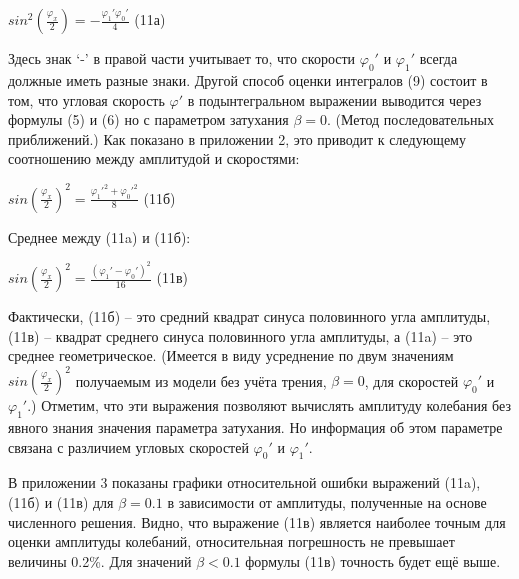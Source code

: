 \documentclass[a4paper]{article}
\begin{document}
\begin{center}$sin^2(\frac{\varphi_x}{2})= -\frac{\varphi_1'\varphi_0'}{4}$ (11а)\end{center}
Здесь знак ‘-’ в правой части учитывает то, что скорости $\varphi_0'$ и $\varphi_1'$ всегда
должные иметь разные знаки.
Другой способ оценки интегралов (9) состоит в том, что угловая скорость $\varphi'$ в подынтегральном выражении выводится через формулы (5)
и (6) но с параметром затухания $\beta=0$. (Метод последовательных приближений.) Как показано в приложении 2, это приводит к следующему
соотношению между амплитудой и скоростями:
\begin{center}$sin(\frac{\varphi_x}{2})^2= \frac{\varphi_1'^2+\varphi_0'^2}{8}$ (11б)\end{center}
Среднее между (11a) и (11б):
\begin{center}$sin(\frac{\varphi_x}{2})^2= \frac{(\varphi_1' - \varphi_0')^2}{16}$ (11в)\end{center}
Фактически, (11б) – это средний квадрат синуса половинного угла 
амплитуды, (11в) – квадрат среднего синуса половинного угла амплитуды, а (11a) – это среднее геометрическое. (Имеется в виду усреднение
по двум значениям $sin(\frac{\varphi_x}{2})^2$ получаемым из модели без учёта трения,
$\beta=0$, для скоростей $\varphi_0'$ и $\varphi_1'$.) Отметим, что эти выражения позволяют
вычислять амплитуду колебания без явного знания значения параметра затухания. Но информация об этом параметре связана с различием
угловых скоростей $\varphi_0'$ и $\varphi_1'$.

В приложении 3 показаны графики относительной ошибки выражений
(11a), (11б) и (11в) для $\beta=0.1$ в зависимости от амплитуды, полученные на основе численного решения. Видно, что выражение (11в) является наиболее точным для оценки амплитуды колебаний, относительная погрешность не превышает величины 0.2\%. Для значений $\beta<0.1$ формулы
(11в) точность будет ещё выше. 
\end{document}
